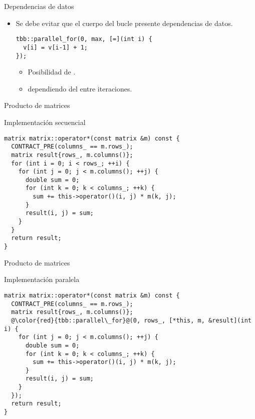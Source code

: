 \begin{frame}[t,fragile]{Dependencias de datos}
\begin{itemize}
  \item Se debe evitar que el cuerpo del bucle presente dependencias de datos.
\begin{lstlisting}
tbb::parallel_for(0, max, [=](int i) {
  v[i] = v[i-1] + 1;
});
\end{lstlisting}
    \begin{itemize}
      \item Posibilidad de .
      \item {} dependiendo del 
             entre iteraciones.
    \end{itemize}
\end{itemize}
\end{frame}

\begin{frame}[t,fragile]{Producto de matrices}
\begin{block}{Implementación secuencial}
\begin{lstlisting}
matrix matrix::operator*(const matrix &m) const {
  CONTRACT_PRE(columns_ == m.rows_);
  matrix result{rows_, m.columns()};
  for (int i = 0; i < rows_; ++i) {
    for (int j = 0; j < m.columns(); ++j) {
      double sum = 0;
      for (int k = 0; k < columns_; ++k) {
        sum += this->operator()(i, j) * m(k, j);
      }
      result(i, j) = sum;
    }
  }
  return result;
}
\end{lstlisting}
\end{block}
\end{frame}

\begin{frame}[t,fragile]{Producto de matrices}
\begin{block}{Implementación paralela}
\begin{lstlisting}[escapechar=@]
matrix matrix::operator*(const matrix &m) const {
  CONTRACT_PRE(columns_ == m.rows_);
  matrix result{rows_, m.columns()};
  @\color{red}{tbb::parallel\_for}@(0, rows_, [*this, m, &result](int i) {
    for (int j = 0; j < m.columns(); ++j) {
      double sum = 0;
      for (int k = 0; k < columns_; ++k) {
        sum += this->operator()(i, j) * m(k, j);
      }
      result(i, j) = sum;
    }
  });
  return result;
}
\end{lstlisting}
\end{block}
\end{frame}


